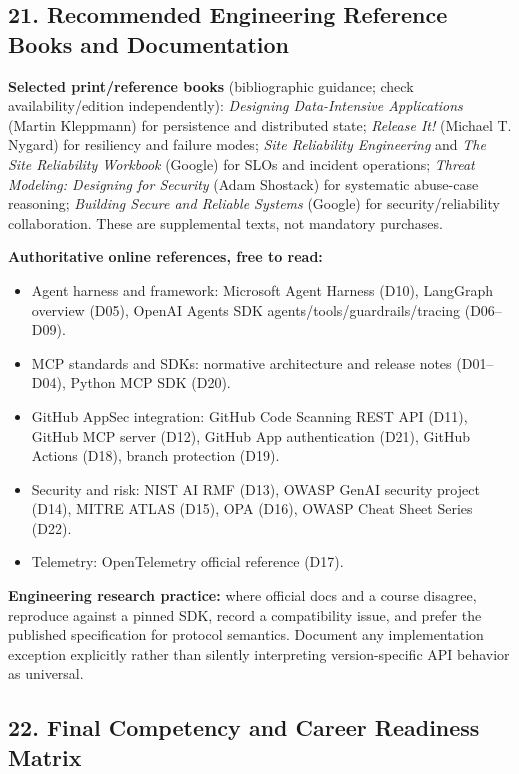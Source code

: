 \documentclass[
  10pt,
]{article}
\providecommand{\tightlist}{%
  \setlength{\itemsep}{0pt}\setlength{\parskip}{0pt}}
\begin{document}
\subsection{21. Recommended Engineering Reference Books and
Documentation}\label{recommended-engineering-reference-books-and-documentation}

\textbf{Selected print/reference books} (bibliographic guidance; check
availability/edition independently): \emph{Designing Data-Intensive
Applications} (Martin Kleppmann) for persistence and distributed state;
\emph{Release It!} (Michael T. Nygard) for resiliency and failure modes;
\emph{Site Reliability Engineering} and \emph{The Site Reliability
Workbook} (Google) for SLOs and incident operations; \emph{Threat
Modeling: Designing for Security} (Adam Shostack) for systematic
abuse-case reasoning; \emph{Building Secure and Reliable Systems}
(Google) for security/reliability collaboration. These are supplemental
texts, not mandatory purchases.

\textbf{Authoritative online references, free to read:}

\begin{itemize}
\tightlist
\item
  Agent harness and framework: Microsoft Agent Harness (D10), LangGraph
  overview (D05), OpenAI Agents SDK agents/tools/guardrails/tracing
  (D06--D09).
\item
  MCP standards and SDKs: normative architecture and release notes
  (D01--D04), Python MCP SDK (D20).
\item
  GitHub AppSec integration: GitHub Code Scanning REST API (D11), GitHub
  MCP server (D12), GitHub App authentication (D21), GitHub Actions
  (D18), branch protection (D19).
\item
  Security and risk: NIST AI RMF (D13), OWASP GenAI security project
  (D14), MITRE ATLAS (D15), OPA (D16), OWASP Cheat Sheet Series (D22).
\item
  Telemetry: OpenTelemetry official reference (D17).
\end{itemize}

\textbf{Engineering research practice:} where official docs and a course
disagree, reproduce against a pinned SDK, record a compatibility issue,
and prefer the published specification for protocol semantics. Document
any implementation exception explicitly rather than silently
interpreting version-specific API behavior as universal.

\subsection{22. Final Competency and Career Readiness
Matrix}\label{final-competency-and-career-readiness-matrix}
\end{document}
